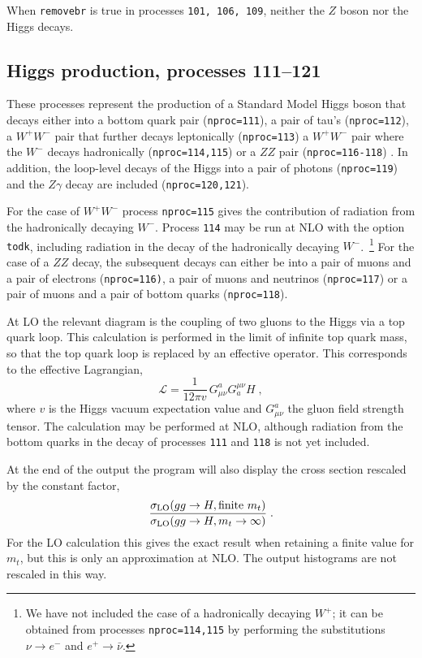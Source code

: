 \documentclass[12pt]{article}
\begin{document}
When {\tt removebr} is true in processes {\tt 101, 106, 109}, neither the $Z$ boson
nor the Higgs decays.

\subsection{Higgs production, processes 111--121}
\label{subsec:h}

These processes represent the production of a Standard Model Higgs
boson that decays either into a bottom quark
pair ({\tt nproc=111}), a pair of tau's ({\tt nproc=112}), 
a $W^+W^-$ 
pair that further decays leptonically ({\tt nproc=113}) 
a $W^+W^-$ pair where the $W^-$ decays hadronically ({\tt nproc=114,115}) 
or a $ZZ$ pair ({\tt nproc=116-118}) . In addition, the loop-level decays of the Higgs 
into a pair of photons ({\tt nproc=119}) and the $Z\gamma$ decay are included
({\tt nproc=120,121}).

For the case of $W^+W^-$ process {\tt nproc=115} gives the contribution 
of radiation from the hadronically decaying $W^-$.
Process {\tt 114} may be run at NLO with the option {\tt todk},
including radiation in the decay of the hadronically decaying $W^-$.~\footnote{
We have not included the case of a hadronically decaying $W^+$; it can
be obtained from processes {\tt nproc=114,115} by performing the
substitutions $\nu \to e^-$ and $e^+ \to \bar{\nu}$.}
For the case of a $ZZ$ decay,
the subsequent decays can either be into a pair of muons and a pair of electrons
({\tt nproc=116)}, a pair of muons and neutrinos ({\tt nproc=117}) or
a pair of muons and a pair of bottom quarks ({\tt nproc=118}).

At LO the relevant diagram
is the coupling of two gluons to the Higgs via a top quark loop.
This calculation is performed in the limit of infinite top quark mass, so that 
the top quark loop is replaced by an effective operator. This corresponds
to the effective Lagrangian,
\begin{equation}
\mathcal{L} = \frac{1}{12\pi v} \, G^a_{\mu\nu} G^{\mu\nu}_a H \;,
\label{eq:HeffL}
\end{equation}
where $v$ is the Higgs vacuum expectation value and $G^a_{\mu\nu}$ the
gluon field strength tensor.
The calculation may be performed at NLO, although radiation from the
bottom quarks in the decay of processes {\tt 111} and {\tt 118} is not yet included.

At the end of the output the program will also display the cross section rescaled
by the constant factor,
\begin{equation}
\frac{\sigma_{\rm LO}(gg \to H, \mbox{finite}~m_t)}{\sigma_{\rm LO}(gg \to H, m_t \to \infty)} \;.
\label{eqn:hrescale}
\end{equation}
For the LO calculation this gives the exact result when retaining a finite value for $m_t$,
but this is only an approximation at NLO. The output histograms are not rescaled in this way.
\end{document}
